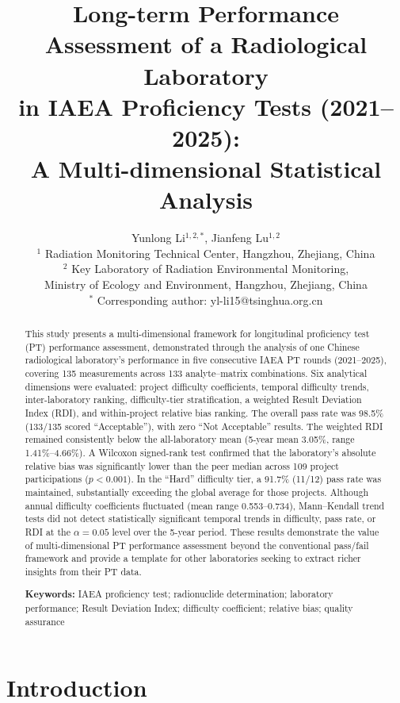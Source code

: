 \documentclass[12pt,a4paper,twoside]{article}
\title{\textbf{Long-term Performance Assessment of a Radiological Laboratory\\
in IAEA Proficiency Tests (2021--2025):\\
A Multi-dimensional Statistical Analysis}}
\author{%
  \large Yunlong Li$^{1,2,*}$, Jianfeng Lu$^{1,2}$ \\[4pt]
  \small $^1$ Radiation Monitoring Technical Center, Hangzhou, Zhejiang, China\\
  \small $^2$ Key Laboratory of Radiation Environmental Monitoring, \\ \small Ministry of Ecology and Environment, Hangzhou, Zhejiang, China\\
  \small $^*$ Corresponding author: yl-li15@tsinghua.org.cn
}
\date{}
\begin{document}
\maketitle

\begin{abstract}
\noindent
This study presents a multi-dimensional framework for longitudinal proficiency test (PT) performance assessment, demonstrated through the analysis of one Chinese radiological laboratory's performance in five consecutive IAEA PT rounds (2021--2025), covering 135 measurements across 133 analyte--matrix combinations. Six analytical dimensions were evaluated: project difficulty coefficients, temporal difficulty trends, inter-laboratory ranking, difficulty-tier stratification, a weighted Result Deviation Index (RDI), and within-project relative bias ranking. The overall pass rate was 98.5\% (133/135 scored ``Acceptable''), with zero ``Not Acceptable'' results. The weighted RDI remained consistently below the all-laboratory mean (5-year mean 3.05\%, range 1.41\%--4.66\%). A Wilcoxon signed-rank test confirmed that the laboratory's absolute relative bias was significantly lower than the peer median across 109 project participations ($p < 0.001$). In the ``Hard'' difficulty tier, a 91.7\% (11/12) pass rate was maintained, substantially exceeding the global average for those projects. Although annual difficulty coefficients fluctuated (mean range 0.553--0.734), Mann--Kendall trend tests did not detect statistically significant temporal trends in difficulty, pass rate, or RDI at the $\alpha = 0.05$ level over the 5-year period. These results demonstrate the value of multi-dimensional PT performance assessment beyond the conventional pass/fail framework and provide a template for other laboratories seeking to extract richer insights from their PT data.

\vspace{6pt}
\noindent\textbf{Keywords:} IAEA proficiency test; radionuclide determination; laboratory performance; Result Deviation Index; difficulty coefficient; relative bias; quality assurance
\end{abstract}

\section{Introduction}
\end{document}
